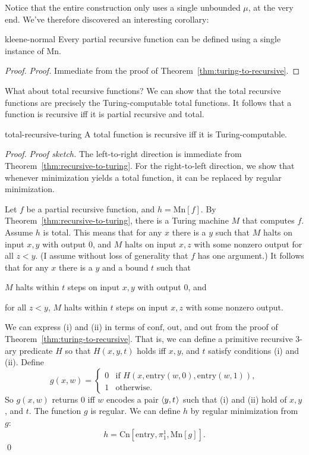 Notice that the entire construction only uses a single unbounded $\mu$,
at the very end.
We've therefore discovered an interesting corollary:

\begin{theorem}{}{kleene-normal}
  Every partial recursive function can be defined using a single instance of $\mathrm{Mn}$.
\end{theorem}
\begin{proof}
  \emph{Proof.}
  Immediate from the proof of Theorem~\ref{thm:turing-to-recursive}.
\end{proof}

What about total recursive functions?
We can show that the total recursive functions are precisely the Turing-computable total functions.
It follows that a function is recursive iff
it is partial recursive and total.

\begin{theorem}{}{total-recursive-turing}
  A total function is recursive iff it is Turing-computable.
\end{theorem}
\begin{proof}
  \emph{Proof sketch.}
  The left-to-right direction is immediate from Theorem~\ref{thm:recursive-to-turing}.
  For the right-to-left direction,
  we show that
  whenever minimization yields a total function,
  it can be replaced by regular minimization.
  
  Let $f$ be a partial recursive function, and $h = \mathrm{Mn}[f]$.
  By Theorem~\ref{thm:recursive-to-turing},
  there is a Turing machine $M$ that computes $f$.
  Assume $h$ is total.
  This means that for any $x$ there is a $y$ such that
  $M$ halts on input $x,y$ with output 0, and
  $M$ halts on input $x,z$ with some nonzero output for all $z < y$.
  (I assume without loss of generality that $f$ has one argument.)
  It follows that for any $x$ there is a $y$ and a bound $t$ such that
  \begin{cenumerate}
    \item[(i)] $M$ halts within $t$ steps on input $x,y$ with output 0, and
    \item[(ii)] for all $z < y$, $M$ halts within $t$ steps on input $x,z$ with some nonzero output.
  \end{cenumerate}
  We can express (i) and (ii) in terms of $\mathrm{conf}$, $\mathrm{out}$, and $\mathrm{out}$ from the proof of Theorem~\ref{thm:turing-to-recursive}.
  That is,
  we can define a primitive recursive 3-ary predicate $H$ so that $H(x,y,t)$ holds iff $x,y$, and $t$ satisfy conditions (i) and (ii).
  Define
  \[
    g(x,w) =
    \begin{cases}
      0 & \text{if } H(x,\mathrm{entry}(w,0),\mathrm{entry}(w,1)), \\
      1 & \text{otherwise.}
    \end{cases}
  \]
  So $g(x,w)$ returns 0 iff $w$ encodes a pair $\t{y,t}$ such that (i) and (ii) hold
  of $x,y$, and $t$.
  The function $g$ is regular.
  We can define $h$ by regular minimization from $g$:
  \[
    h = \mathrm{Cn}[\mathrm{entry}, \pi^1_1, \mathrm{Mn}[g]].
  \]
  \qed
\end{proof}

